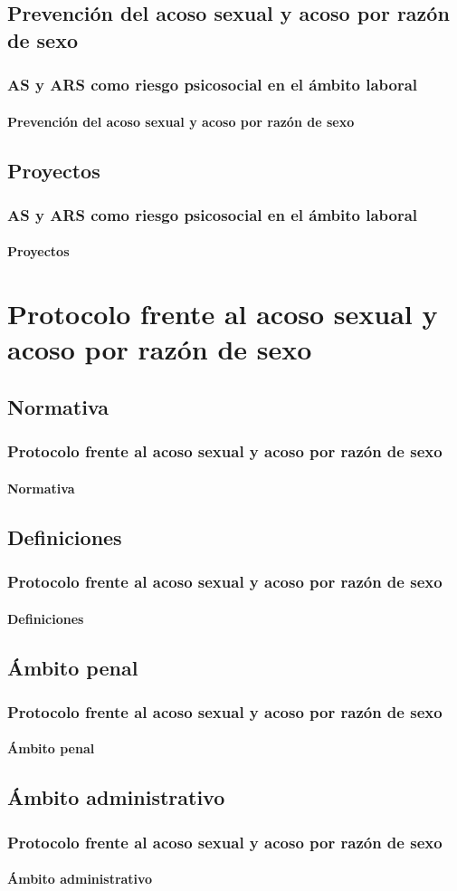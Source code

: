 \documentclass{beamer}
\begin{document}
    \subsection{Prevención del acoso sexual y acoso por razón de sexo}
    \begin{frame}
		\frametitle{AS y ARS como riesgo psicosocial en el ámbito laboral}
        \framesubtitle{Prevención del acoso sexual y acoso por razón de sexo}
	\end{frame}

	\subsection{Proyectos}
    \begin{frame}
		\frametitle{AS y ARS como riesgo psicosocial en el ámbito laboral}
        \framesubtitle{Proyectos}
	\end{frame}

    \section{Protocolo frente al acoso sexual y acoso por razón de sexo}

    \subsection{Normativa}
    \begin{frame}
		\frametitle{Protocolo frente al acoso sexual y acoso por razón de sexo}
        \framesubtitle{Normativa}
	\end{frame}

    \subsection{Definiciones}
    \begin{frame}
		\frametitle{Protocolo frente al acoso sexual y acoso por razón de sexo}
        \framesubtitle{Definiciones}
	\end{frame}

    \subsection{Ámbito penal}
    \begin{frame}
		\frametitle{Protocolo frente al acoso sexual y acoso por razón de sexo}
        \framesubtitle{Ámbito penal}
	\end{frame}

    \subsection{Ámbito administrativo}
    \begin{frame}
		\frametitle{Protocolo frente al acoso sexual y acoso por razón de sexo}
        \framesubtitle{Ámbito administrativo}
	\end{frame}
\end{document}
